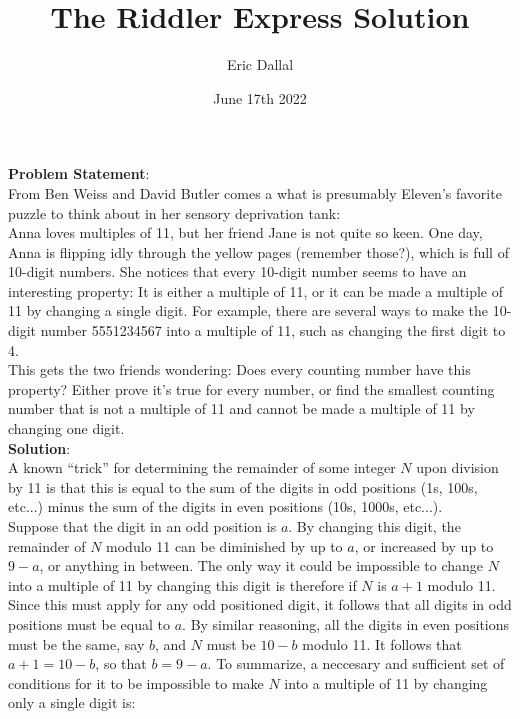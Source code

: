 \documentclass[10pt,a4paper]{article}
\title{The Riddler Express Solution}
\date{June 17th 2022}
\author{Eric Dallal}
\begin{document}
\maketitle
\textbf{Problem Statement}:\\

From Ben Weiss and David Butler comes a what is presumably Eleven’s favorite puzzle to think about in her sensory deprivation tank:\\

Anna loves multiples of 11, but her friend Jane is not quite so keen. One day, Anna is flipping idly through the yellow pages (remember those?), which is full of 10-digit numbers. She notices that every 10-digit number seems to have an interesting property: It is either a multiple of 11, or it can be made a multiple of 11 by changing a single digit. For example, there are several ways to make the 10-digit number 5551234567 into a multiple of 11, such as changing the first digit to 4.\\

This gets the two friends wondering: Does every counting number have this property? Either prove it’s true for every number, or find the smallest counting number that is not a multiple of 11 and cannot be made a multiple of 11 by changing one digit.\\

\textbf{Solution}:\\
A known ``trick'' for determining the remainder of some integer $N$ upon division by 11 is that this is equal to the sum of the digits in odd positions (1s, 100s, etc...) minus the sum of the digits in even positions (10s, 1000s, etc...).\\

Suppose that the digit in an odd position is $a$. By changing this digit, the remainder of $N$ modulo 11 can be diminished by up to $a$, or increased by up to $9 - a$, or anything in between. The only way it could be impossible to change $N$ into a multiple of 11 by changing this digit is therefore if $N$ is $a + 1$ modulo 11. Since this must apply for any odd positioned digit, it follows that all digits in odd positions must be equal to $a$. By similar reasoning, all the digits in even positions must be the same, say $b$, and $N$ must be $10 - b$ modulo 11. It follows that $a + 1 = 10 - b$, so that $b = 9 - a$. To summarize, a neccesary and sufficient set of conditions for it to be impossible to make $N$ into a multiple of 11 by changing only a single digit is:\\
\end{document}
